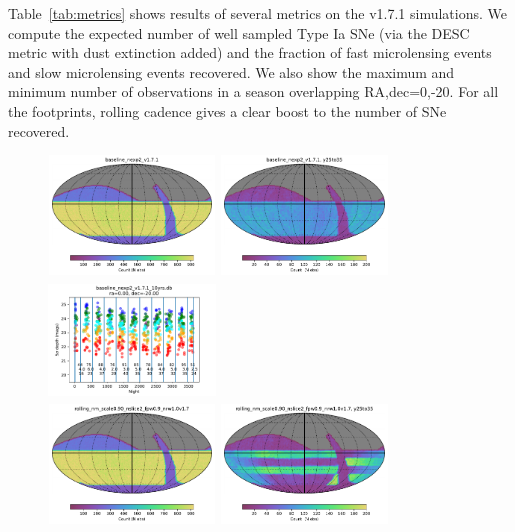 \documentclass[modern]{aastex62}
\begin{document}
Table~\ref{tab:metrics} shows results of several metrics on the v1.7.1 simulations. We compute the expected number of well sampled Type Ia SNe (via the DESC metric with dust extinction added) and the fraction of fast microlensing events and slow microlensing events recovered. We also show the maximum and minimum number of observations in a season overlapping RA,dec=0,-20. For all the footprints, rolling cadence gives a clear boost to the number of SNe recovered.  

\begin{figure}
\includegraphics[height=1.25in, width=1.75in]{plots/baseline_nexp2_v1.7.1/baseline_nexp2_v1_7_1_Count_HEAL_SkyMap.pdf}
\includegraphics[height=1.25in, width=1.75in]{plots/baseline_nexp2_v1.7.1/baseline_nexp2_v1_7_1_Count_night_gt_913_125000_and_night_lt_1278_375000_and_note_not_like_DD_HEAL_SkyMap.pdf}
\includegraphics[height=1.25in, width=1.75in]{plots/baseline_nexp2_v171_spotc.pdf}\\
\includegraphics[height=1.25in, width=1.75in]{plots/rolling_nm_scale0.90_nslice2_fpw0.9_nrw1.0v1.7/rolling_nm_scale0_90_nslice2_fpw0_9_nrw1_0v1_7_Count_HEAL_SkyMap.pdf}
\includegraphics[height=1.25in, width=1.75in]{plots/rolling_nm_scale0.90_nslice2_fpw0.9_nrw1.0v1.7/rolling_nm_scale0_90_nslice2_fpw0_9_nrw1_0v1_7_Count_night_gt_913_125000_and_night_lt_1278_375000_and_note_not_like_DD_HEAL_SkyMap.pdf}

\end{figure}
\end{document}
